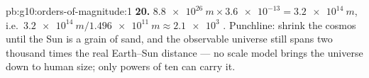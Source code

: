 \begin{solution}{pb:g10:orders-of-magnitude:1}
\textbf{20.} $\qty{8.8e26}{m} \times \num{3.6e-13} = \qty{3.2e14}{m}$,
i.e.\ $\qty{3.2e14}{m}/\qty{1.496e11}{m} \approx \num{2.1e3}$
. Punchline: shrink the cosmos until the Sun is a
grain of sand, and the observable universe still spans two thousand
times the real Earth--Sun distance --- no scale model brings the
universe down to human size; only powers of ten can carry it.
\end{solution}
